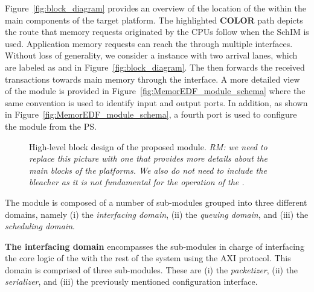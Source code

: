 Figure~\ref{fig:block_diagram} provides an overview of the location of
the \schim within the main components of the target platform. The
highlighted {\bf COLOR} path depicts the route that memory requests
originated by the CPUs follow when the SchIM is used. Application
memory requests can reach the \schim through multiple
interfaces. Without loss of generality, we consider a \schim instance
with two arrival lanes, which are labeled as  and 
in Figure~\ref{fig:block_diagram}. The \schim then forwards the
received transactions towards main memory through the 
interface. A more detailed view of the \schim module is provided in
Figure~\ref{fig:MemorEDF_module_schema} where the same convention is
used to identify input and output ports. In addition, as shown in
Figure~\ref{fig:MemorEDF_module_schema}, a fourth  port is
used to configure the \schim module from the PS.


\begin{figure}
  \centering
  
  \caption{High-level block design of the proposed \schim
    module. \emph{RM: we need to replace this picture with one that
      provides more details about the main blocks of the platforms. We
      also do not need to include the bleacher as it is not
      fundamental for the operation of the \schim.}}
  \label{fig:SchIM_overview_schema}
\end{figure}


The \schim module is composed of a number of sub-modules grouped into
three different domains, namely (i) the \emph{interfacing domain},
(ii) the \emph{queuing domain}, and (iii) the \emph{scheduling
  domain}.

\par{\bf The interfacing domain} encompasses the sub-modules in charge
of interfacing the core logic of the \schim with the rest of the
system using the AXI protocol.  This domain is comprised of three
sub-modules. These are (i) the \emph{packetizer}, (ii) the
\emph{serializer}, and (iii) the previously mentioned configuration
interface.

